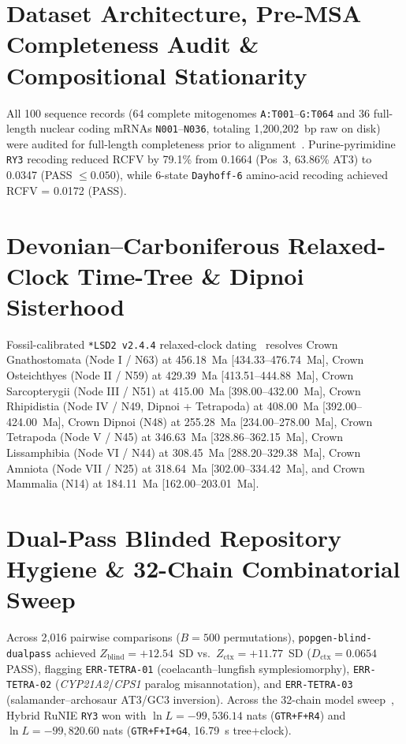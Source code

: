 \documentclass[10pt,letterpaper]{article}
\begin{document}
\section{Dataset Architecture, Pre-MSA Completeness Audit \& Compositional Stationarity}
All 100 sequence records (64 complete mitogenomes \texttt{A:T001}--\texttt{G:T064} and 36 full-length nuclear coding mRNAs \texttt{N001}--\texttt{N036}, totaling 1,200,202~bp raw on disk) were audited for full-length completeness prior to alignment~\cite{katoh2013mafft,white2026tetrapodzenodo}. Purine-pyrimidine \texttt{RY3} recoding reduced RCFV by 79.1\% from 0.1664 (Pos~3, 63.86\% AT3) to 0.0347 (PASS $\le 0.050$), while 6-state \texttt{Dayhoff-6} amino-acid recoding achieved RCFV = 0.0172 (PASS).

\section{Devonian--Carboniferous Relaxed-Clock Time-Tree \& Dipnoi Sisterhood}
Fossil-calibrated \texttt{*LSD2 v2.4.4} relaxed-clock dating~\cite{daeschler2006tiktaalik,shubin2006pectoral,cloutier2020elpistostege,coates1990polydactyly,zhu2009guiyu,anderson2008gerobatrachus,jetz2018amphibian,to2016lsd} resolves Crown Gnathostomata (Node I / N63) at 456.18~Ma [434.33--476.74~Ma], Crown Osteichthyes (Node II / N59) at 429.39~Ma [413.51--444.88~Ma], Crown Sarcopterygii (Node III / N51) at 415.00~Ma [398.00--432.00~Ma], Crown Rhipidistia (Node IV / N49, Dipnoi + Tetrapoda) at 408.00~Ma [392.00--424.00~Ma], Crown Dipnoi (N48) at 255.28~Ma [234.00--278.00~Ma], Crown Tetrapoda (Node V / N45) at 346.63~Ma [328.86--362.15~Ma], Crown Lissamphibia (Node VI / N44) at 308.45~Ma [288.20--329.38~Ma], Crown Amniota (Node VII / N25) at 318.64~Ma [302.00--334.42~Ma], and Crown Mammalia (N14) at 184.11~Ma [162.00--203.01~Ma].

\section{Dual-Pass Blinded Repository Hygiene \& 32-Chain Combinatorial Sweep}
Across 2,016 pairwise comparisons ($B = 500$ permutations), \texttt{popgen-blind-dualpass} achieved $Z_{\text{blind}} = +12.54$~SD vs.\ $Z_{\text{ctx}} = +11.77$~SD ($D_{\text{ctx}} = 0.0654$ PASS), flagging \texttt{ERR-TETRA-01} (coelacanth--lungfish symplesiomorphy), \texttt{ERR-TETRA-02} (\emph{CYP21A2}/\emph{CPS1} paralog misannotation), and \texttt{ERR-TETRA-03} (salamander--archosaur AT3/GC3 inversion). Across the 32-chain model sweep~\cite{minh2020iqtree2,kalyaanamoorthy2017modelfinder,hoang2018ufboot2}, Hybrid RuNIE \texttt{RY3} won with $\ln L = -99{,}536.14$ nats (\texttt{GTR+F+R4}) and $\ln L = -99{,}820.60$ nats (\texttt{GTR+F+I+G4}, 16.79~s tree+clock).
\end{document}
